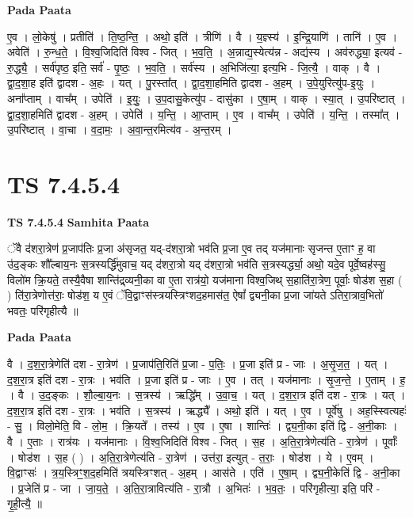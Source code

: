 \documentclass[17pt]{extarticle}
\begin{document}
\textbf{Pada Paata} \newline

ए॒व । लो॒केषु॑ । प्रतीति॑ । ति॒ष्ठ॒न्ति॒ । अथो॒ इति॑ । त्रीणि॑ । वै । य॒ज्ञ्स्य॑ । इ॒न्द्रि॒याणि॑ । तानि॑ । ए॒व । अवेति॑ । रु॒न्ध॒ते॒ । वि॒श्व॒जिदिति॑ विश्व - जित् । भ॒व॒ति॒ । अ॒न्नाद्य॒स्येत्य॑न्न - अद्य॑स्य । अव॑रुद्ध्या॒ इत्यव॑ - रु॒द्ध्यै॒ । सर्व॑पृष्ठ॒ इति॒ सर्व॑ - पृ॒ष्ठः॒ । भ॒व॒ति॒ । सर्व॑स्य । अ॒भिजि॑त्या॒ इत्य॒भि - जि॒त्यै॒ । वाक् । वै । द्वा॒द॒शा॒ह इति॑ द्वादश - अ॒हः । यत् । पु॒रस्ता᳚त् । द्वा॒द॒शा॒हमिति द्वादश - अ॒हम् । उ॒पे॒युरित्यु॑प-इ॒युः । अना᳚प्ताम् । वाच᳚म् । उपेति॑ । इ॒युः॒ । उ॒प॒दासु॒केत्यु॑प - दासु॑का । ए॒षा॒म् । वाक् । स्या॒त् । उ॒परि॑ष्टात् । द्वा॒द॒शा॒हमिति॑ द्वादश - अ॒हम् । उपेति॑ । य॒न्ति॒ । आ॒प्ताम् । ए॒व । वाच᳚म् । उपेति॑ । य॒न्ति॒ । तस्मा᳚त् । उ॒परि॑ष्टात् । वा॒चा । व॒दा॒मः॒ । अ॒वा॒न्त॒रमित्य॑व - अ॒न्त॒रम् ।  \newline





\section{ TS 7.4.5.4 }

\textbf{TS 7.4.5.4 } \newline
\textbf{Samhita Paata} \newline

ॅवै द॑शरा॒त्रेण॑ प्र॒जाप॑तिः प्र॒जा अ॑सृजत॒ यद्-द॑शरा॒त्रो भव॑ति प्र॒जा ए॒व तद् यज॑मानाः सृजन्त ए॒ताꣳ ह॒ वा उ॑द॒ङ्कः शौ᳚ल्बाय॒नः स॒त्रस्यर्द्धि॑मुवाच॒ यद् द॑शरा॒त्रो यद् द॑शरा॒त्रो भव॑ति स॒त्रस्यर्द्ध्या॒ अथो॒ यदे॒व पूर्वे॒ष्वह॑स्सु॒ विलो॑म क्रि॒यते॒ तस्यै॒वैषा शान्ति॑द्र्व्यनी॒का वा ए॒ता रात्र॑यो॒ यज॑माना विश्व॒जिथ् स॒हाति॑रा॒त्रेण॒ पूर्वाः॒ षोड॑श स॒हा ( ) ति॑रा॒त्रेणोत्त॑राः॒ षोड॑श॒ य ए॒वं ॅवि॒द्वाꣳस॑स्त्रयस्त्रिꣳशद॒हमास॑त॒ ऐषां᳚ द्व्यनी॒का प्र॒जा जा॑यते ऽतिरा॒त्राव॒भितो॑ भवतः॒ परि॑गृहीत्यै ॥ \newline

\textbf{Pada Paata} \newline

वै । द॒श॒रा॒त्रेणेति॑ दश - रा॒त्रेण॑ । प्र॒जाप॑ति॒रिति॑ प्र॒जा - प॒तिः॒ । प्र॒जा इति॑ प्र - जाः । अ॒सृ॒ज॒त॒ । यत् । द॒श॒रा॒त्र इति॑ दश - रा॒त्रः । भव॑ति । प्र॒जा इति॑ प्र - जाः । ए॒व । तत् । यज॑मानाः । सृ॒ज॒न्ते॒ । ए॒ताम् । ह॒ । वै । उ॒द॒ङ्कः । शौ॒ल्बा॒य॒नः । स॒त्रस्य॑ । ऋद्धि᳚म् । उ॒वा॒च॒ । यत् । द॒श॒रा॒त्र इति॑ दश - रा॒त्रः । यत् । द॒श॒रा॒त्र इति॑ दश - रा॒त्रः । भव॑ति । स॒त्रस्य॑ । ऋद्ध्यै᳚ । अथो॒ इति॑ । यत् । ए॒व । पूर्वे॑षु । अह॒स्स्वित्यहः॑ - सु॒ । विलो॒मेति॒ वि - लो॒म॒ । क्रि॒यते᳚ । तस्य॑ । ए॒व । ए॒षा । शान्तिः॑ । द्व्य॒नी॒का इति॑ द्वि - अ॒नी॒काः । वै । ए॒ताः । रात्र॑यः । यज॑मानाः । वि॒श्व॒जिदिति॑ विश्व - जित् । स॒ह । अ॒ति॒रा॒त्रेणेत्य॑ति - रा॒त्रेण॑ । पूर्वाः᳚ । षोड॑श । स॒ह ( ) । अ॒ति॒रा॒त्रेणेत्य॑ति - रा॒त्रेण॑ । उत्त॑रा॒ इत्युत् - त॒राः॒ । षोड॑श । ये । ए॒वम् । वि॒द्वाꣳसः॑ । त्र॒य॒स्त्रिꣳ॒॒श॒द॒हमिति॑ त्रयस्त्रिꣳशत् - अ॒हम् । आस॑ते । एति॑ । ए॒षा॒म् । द्व्य॒नी॒केति॑ द्वि - अ॒नी॒का । प्र॒जेति॑ प्र - जा । जा॒य॒ते॒ । अ॒ति॒रा॒त्रावित्य॑ति - रा॒त्रौ । अ॒भितः॑ । भ॒व॒तः॒ । परि॑गृहीत्या॒ इति॒ परि॑ - गृ॒ही॒त्यै॒ ॥  \newline
\end{document}
